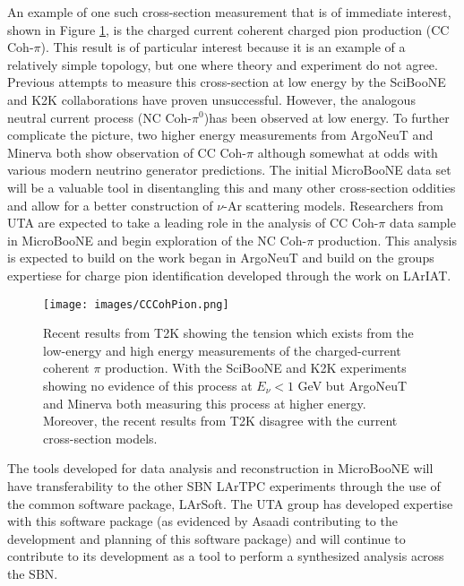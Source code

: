 An example of one such cross-section measurement that is of immediate interest, shown in Figure \ref{fig:cccohpion}, is the charged current coherent charged pion production (CC Coh-$\pi$). This result is of particular interest because it is an example of a relatively simple topology, but one where theory and experiment do not agree. Previous attempts to measure this cross-section at low energy by the SciBooNE and K2K collaborations have proven unsuccessful. However, the analogous neutral current process (NC Coh-$\pi^{0}$)has been observed at low energy. To further complicate the picture, two higher energy measurements from ArgoNeuT and Minerva both show observation of CC Coh-$\pi$ although somewhat at odds with various modern neutrino generator predictions. The initial MicroBooNE data set will be a valuable tool in disentangling this and many other cross-section oddities and allow for a better construction of $\nu$-Ar scattering models. Researchers from UTA are expected to take a leading role in the analysis of CC Coh-$\pi$ data sample in MicroBooNE and begin exploration of the NC Coh-$\pi$ production. This analysis is expected to build on the work began in ArgoNeuT \cite{} and build on the groups expertiese for charge pion identification developed through the work on LArIAT.
 
\begin{figure}[htb]
\centering
\texttt{[image: images/CCCohPion.png]}
\caption[]{Recent results from T2K \cite{} showing the tension which exists from the low-energy and high energy measurements of the charged-current coherent $\pi$ production. With the SciBooNE and K2K experiments showing no evidence of this process at $E_{\nu} < 1$ GeV but ArgoNeuT and Minerva both measuring this process at higher energy. Moreover, the recent results from T2K disagree with the current cross-section models.}
\label{fig:cccohpion}
\end{figure}


The tools developed for data analysis and reconstruction in MicroBooNE will have transferability to the other SBN LArTPC experiments through the use of the common software package, LArSoft. The UTA group has developed expertise with this software package (as evidenced by Asaadi contributing to the development and planning of this software package) and will continue to contribute to its development as a tool to perform a synthesized analysis across the SBN.
